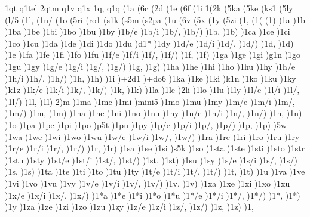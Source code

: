 {{1qt
q1tel
2qtm
q1v
q1x
1q,
q1q
(1a
(6c
(2d
(1e
(6f
(1i
1(2k
(5ka
(5ke
(ks1
(5ly
(l/5
(1l,
(1n/
(1o
(5ri
(ro1
(s1k
(s5m
(s2pa
(1u
(6v
(5x
(1y
(5zi
(1,
(1(
(1)
)1a
)1b
)1ba
)1be
)1bi
)1bo
)1bu
)1by
)1b/e
)1b/i
)1b/,
)1b/)
)1b,
)1b)
)1ca
)1ce
)1ci
)1co
)1cu
)1da
)1de
)1di
)1do
)1du
)d1*
)1dy
)1d/e
)1d/i
)1d/,
)1d/)
)1d,
)1d)
)1e
)1fa
)1fe
)1fi
)1fo
)1fu
)1f/e
)1f/i
)1f/,
)1f/)
)1f,
)1f)
)1ga
)1ge
)1gi
)g1n
)1go
)1gu
)1gy
)1g/e
)1g/i
)1g/,
)1g/)
)1g,
)1g)
)1ha
)1he
)1hi
)1ho
)1hu
)1hy
)1h/e
)1h/i
)1h/,
)1h/)
)1h,
)1h)
)1i
)+2d1
)+do6
)1ka
)1ke
)1ki
)k1n
)1ko
)1ku
)1ky
)k1z
)1k/e
)1k/i
)1k/,
)1k/)
)1k,
)1k)
)1la
)1le
)2li
)1lo
)1lu
)1ly
)1l/e
)1l/i
)1l/,
)1l/)
)1l,
)1l)
2)m
)1ma
)1me
)1mi
)mini5
)1mo
)1mu
)1my
)1m/e
)1m/i
)1m/,
)1m/)
)1m,
)1m)
)1na
)1ne
)1ni
)1no
)1nu
)1ny
)1n/e
)1n/i
)1n/,
)1n/)
)1n,
)1n)
)1o
)1pa
)1pe
)1pi
)1po
)p5t
)1pu
)1py
)1p/e
)1p/i
)1p/,
)1p/)
)1p,
)1p)
)5w
)1wa
)1we
)1wi
)1wo
)1wu
)1w/e
)1w/i
)1w/,
)1w/)
)1ra
)1re
)1ri
)1ro
)1ru
)1ry
)1r/e
)1r/i
)1r/,
)1r/)
)1r,
)1r)
)1sa
)1se
)1si
)s5k
)1so
)1sta
)1ste
)1sti
)1sto
)1str
)1stu
)1sty
)1st/e
)1st/i
)1st/,
)1st/)
)1st,
)1st)
)1su
)1sy
)1s/e
)1s/i
)1s/,
)1s/)
)1s,
)1s)
)1ta
)1te
)1ti
)1to
)1tu
)1ty
)1t/e
)1t/i
)1t/,
)1t/)
)1t,
)1t)
)1u
)1va
)1ve
)1vi
)1vo
)1vu
)1vy
)1v/e
)1v/i
)1v/,
)1v/)
)1v,
)1v)
)1xa
)1xe
)1xi
)1xo
)1xu
)1x/e
)1x/i
)1x/,
)1x/)
)1*a
)1*e
)1*i
)1*o
)1*u
)1*/e
)1*/i
)1*/,
)1*/)
)1*,
)1*)
)1y
)1za
)1ze
)1zi
)1zo
)1zu
)1zy
)1z/e
)1z/i
)1z/,
)1z/)
)1z,
)1z)
)1,
}}
